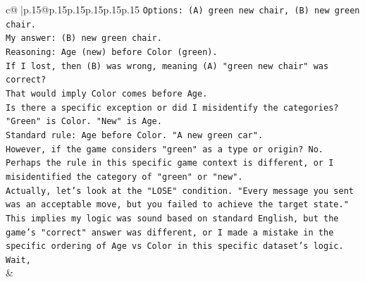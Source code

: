 \documentclass{article}
\begin{document}
{\begin{supertabular}{c@{$\;$}|p{.15\linewidth}@{}p{.15\linewidth}p{.15\linewidth}p{.15\linewidth}p{.15\linewidth}p{.15\linewidth}}
{{{\texttt{Options: (A) green new chair, (B) new green chair.} \\
\texttt{My answer: (B) new green chair.} \\
\texttt{Reasoning: Age (new) before Color (green).} \\
\texttt{If I lost, then (B) was wrong, meaning (A) "green new chair" was correct?} \\
\texttt{That would imply Color comes before Age.} \\
\texttt{Is there a specific exception or did I misidentify the categories?} \\
\texttt{"Green" is Color. "New" is Age.} \\
\texttt{Standard rule: Age before Color. "A new green car".} \\
\texttt{However, if the game considers "green" as a type or origin? No.} \\
\texttt{Perhaps the rule in this specific game context is different, or I misidentified the category of "green" or "new".} \\
\texttt{Actually, let's look at the "LOSE" condition. "Every message you sent was an acceptable move, but you failed to achieve the target state."} \\
\texttt{This implies my logic was sound based on standard English, but the game's "correct" answer was different, or I made a mistake in the specific ordering of Age vs Color in this specific dataset's logic.} \\
\texttt{Wait,} \\
            }
        }
    }
    & \\ \\

\end{supertabular}
}
\end{document}
